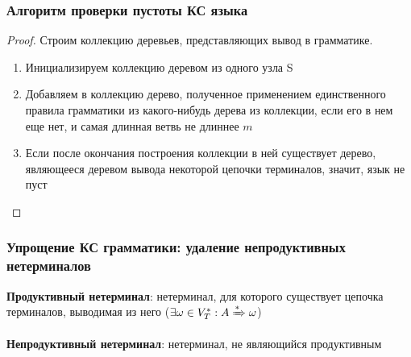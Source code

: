 \documentclass{beamer}
\newcommand{\derives}[1][*]{\xRightarrow[]{#1}}
\begin{document}
\begin{frame}[fragile]
\begin{columns}[T]
\begin{column}{0.45\textwidth}
\begin{center}
    \end{center}
  \end{column}
\end{columns}
\end{frame}

\begin{frame}[fragile]
  \transwipe[direction=90]
  \frametitle{Алгоритм проверки пустоты КС языка}
   \begin{proof}
   Строим коллекцию деревьев, представляющих вывод в грамматике.

  \begin{enumerate}
    \item Инициализируем коллекцию деревом из одного узла S
    \item Добавляем в коллекцию дерево, полученное применением единственного правила грамматики из какого-нибудь дерева из коллекции, если его в нем еще нет, и самая длинная ветвь не длиннее $m$
    \item Если после окончания построения коллекции в ней существует дерево, являющееся деревом вывода некоторой цепочки терминалов, значит, язык не пуст
  \end{enumerate}
   \end{proof}
\end{frame}

\begin{frame}[fragile]
  \transwipe[direction=90]
  \frametitle{Упрощение КС грамматики: удаление непродуктивных нетерминалов}
  \textbf{Продуктивный нетерминал}:  нетерминал, для которого существует цепочка терминалов, выводимая из него ($\exists \omega \in V_T^*: A \derives \omega$)

\vfill

  \textbf{Непродуктивный нетерминал}:  нетерминал, не являющийся продуктивным
\end{frame}
\end{document}
